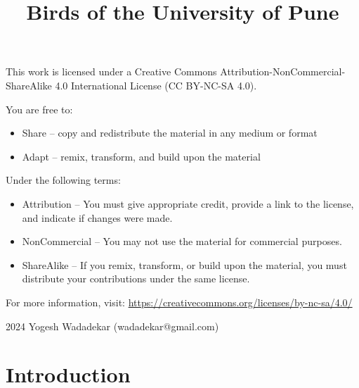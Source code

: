\documentclass[a4paper,12pt,landscape]{memoir}
\title{Birds of the University of Pune}
\author{}
\date{}
\begin{document}
\maketitle

\begin{center}
\vspace{1cm}
{\large This work is licensed under a Creative Commons Attribution-NonCommercial-ShareAlike 4.0 International License (CC BY-NC-SA 4.0).}

\vspace{0.5cm}
{\normalsize You are free to:
\begin{itemize}
\item Share -- copy and redistribute the material in any medium or format
\item Adapt -- remix, transform, and build upon the material
\end{itemize}

Under the following terms:
\begin{itemize}
\item Attribution -- You must give appropriate credit, provide a link to the license, and indicate if changes were made.
\item NonCommercial -- You may not use the material for commercial purposes.
\item ShareAlike -- If you remix, transform, or build upon the material, you must distribute your contributions under the same license.
\end{itemize}
}

\vspace{0.5cm}
{\small For more information, visit: \url{https://creativecommons.org/licenses/by-nc-sa/4.0/}}

\vspace{1cm}
{\large\textcopyright{} 2024 Yogesh Wadadekar (wadadekar@gmail.com)}
\end{center}

\tableofcontents

\chapter*{Introduction}
\end{document}
